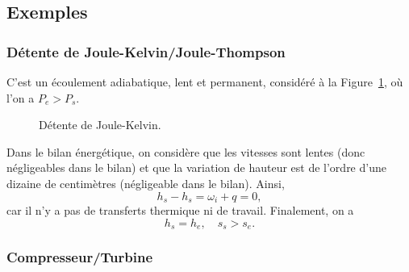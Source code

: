     \subsection{Exemples}
        \subsubsection{Détente de Joule-Kelvin/Joule-Thompson}

            C'est un écoulement adiabatique, lent et permanent, considéré à la Figure~\ref{fig:detente_joule_kelvin}, où l'on a $P_e>P_s$.

            \begin{figure}
                \centering
                \caption{Détente de Joule-Kelvin.}    
                \label{fig:detente_joule_kelvin}
            \end{figure}

            Dans le bilan énergétique, on considère que les vitesses sont lentes (donc négligeables dans le bilan) et que la variation de hauteur est de l'ordre d'une dizaine de centimètres (négligeable dans le bilan). Ainsi,
            \begin{equation*}
                h_s-h_s=\omega_i+q=0,
            \end{equation*}
            car il n'y a pas de transferts thermique ni de travail. Finalement, on a 
            \begin{equation*}
                \boxed{
                    h_s=h_e,\quad s_s>s_e.
                }
            \end{equation*}

        \subsubsection{Compresseur/Turbine}

